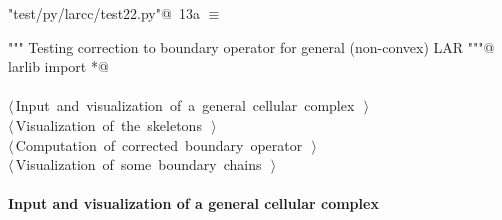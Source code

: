 \documentclass[11pt,oneside]{article}    %
\begin{document}
\begin{flushleft} \small \label{scrap22}
\protect{}\verb@"test/py/larcc/test22.py"@\nobreak\ {\footnotesize 13a }$\equiv$
\vspace{-1ex}
\begin{list}{}{} \item
\mbox{}\verb@""" Testing correction to boundary operator for general (non-convex) LAR """@\\
\mbox{}\verb@from larlib import *@\\
\mbox{}\verb@@\\
\mbox{}\verb@@\hbox{$\langle\,$Input and visualization of a general cellular complex\nobreak\ {\footnotesize {}}$\,\rangle$}\verb@@\\
\mbox{}\verb@@\hbox{$\langle\,$Visualization of the skeletons\nobreak\ {\footnotesize {}}$\,\rangle$}\verb@@\\
\mbox{}\verb@@\hbox{$\langle\,$Computation of corrected boundary operator\nobreak\ {\footnotesize {}}$\,\rangle$}\verb@@\\
\mbox{}\verb@@\hbox{$\langle\,$Visualization of some boundary chains\nobreak\ {\footnotesize {}}$\,\rangle$}\verb@@\\
\mbox{}\verb@@{\NWsep}
\end{list}
\vspace{-2ex}
\end{flushleft}

\paragraph{Input and visualization of a general cellular complex}
\end{document}
